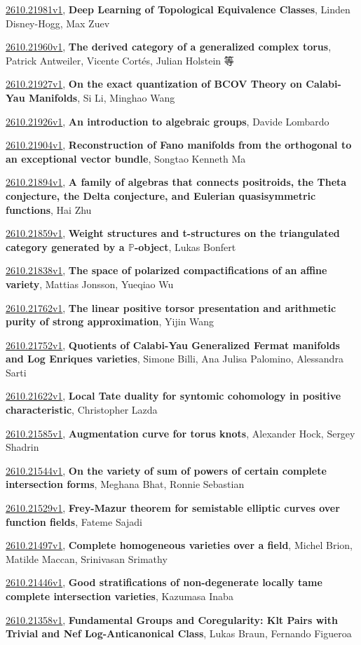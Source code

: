 \documentclass[9pt, a4paper]{article}
\theoremstyle{plain}
\theoremstyle{definition}
\theoremstyle{remark}
\newcommand{\arxiv}[3]{\href{https://arxiv.org/abs/#1}{#1}, \textbf{\textcolor{arxivblue}{#2}}, #3}
\begin{document}
\arxiv{2610.21981v1}{Deep Learning of Topological Equivalence Classes}{Linden Disney-Hogg, Max Zuev}

\arxiv{2610.21960v1}{The derived category of a generalized complex torus}{Patrick Antweiler, Vicente Cortés, Julian Holstein 等}

\arxiv{2610.21927v1}{On the exact quantization of BCOV Theory on Calabi-Yau Manifolds}{Si Li, Minghao Wang}

\arxiv{2610.21926v1}{An introduction to algebraic groups}{Davide Lombardo}

\arxiv{2610.21904v1}{Reconstruction of Fano manifolds from the orthogonal to an exceptional vector bundle}{Songtao Kenneth Ma}

\arxiv{2610.21894v1}{A family of algebras that connects positroids, the Theta conjecture, the Delta conjecture, and Eulerian quasisymmetric functions}{Hai Zhu}

\arxiv{2610.21859v1}{Weight structures and t-structures on the triangulated category generated by a $\mathbb{P}$-object}{Lukas Bonfert}

\arxiv{2610.21838v1}{The space of polarized compactifications of an affine variety}{Mattias Jonsson, Yueqiao Wu}

\arxiv{2610.21762v1}{The linear positive torsor presentation and arithmetic purity of strong approximation}{Yijin Wang}

\arxiv{2610.21752v1}{Quotients of Calabi-Yau Generalized Fermat manifolds and Log Enriques varieties}{Simone Billi, Ana Julisa Palomino, Alessandra Sarti}

\arxiv{2610.21622v1}{Local Tate duality for syntomic cohomology in positive characteristic}{Christopher Lazda}

\arxiv{2610.21585v1}{Augmentation curve for torus knots}{Alexander Hock, Sergey Shadrin}

\arxiv{2610.21544v1}{On the variety of sum of powers of certain complete intersection forms}{Meghana Bhat, Ronnie Sebastian}

\arxiv{2610.21529v1}{Frey-Mazur theorem for semistable elliptic curves over function fields}{Fateme Sajadi}

\arxiv{2610.21497v1}{Complete homogeneous varieties over a field}{Michel Brion, Matilde Maccan, Srinivasan Srimathy}

\arxiv{2610.21446v1}{Good stratifications of non-degenerate locally tame complete intersection varieties}{Kazumasa Inaba}

\arxiv{2610.21358v1}{Fundamental Groups and Coregularity: Klt Pairs with Trivial and Nef Log-Anticanonical Class}{Lukas Braun, Fernando Figueroa}
\end{document}
